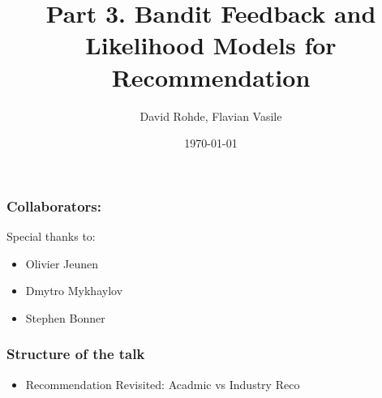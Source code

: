 \documentclass[10pt]{beamer}
\title{Part 3. Bandit Feedback and Likelihood Models for Recommendation}
\date{\today}
\author{David Rohde, Flavian Vasile}
\institute{Criteo Research}
\begin{document}
\maketitle

\begin{frame}
\frametitle{Collaborators:}

Special thanks to:
\begin{itemize}
    \item Olivier Jeunen
    \item Dmytro Mykhaylov
    \item Stephen Bonner
\end{itemize}

\end{frame}


\begin{frame}
\frametitle{Structure of the talk}

\begin{itemize}
\item Recommendation Revisited: Acadmic vs Industry Reco
\end{itemize}

\end{frame}



%
%
%
%
%
%
%
%
%


\end{document}

